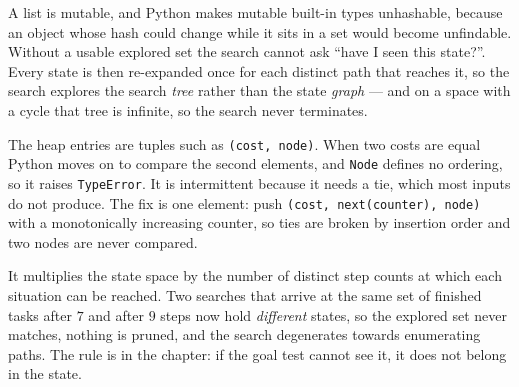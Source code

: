 \begin{ans}
  \item A list is mutable, and Python makes mutable built-in types unhashable,
        because an object whose hash could change while it sits in a set would
        become unfindable. Without a usable explored set the search cannot ask
        ``have I seen this state?''. Every state is then re-expanded once for each
        distinct path that reaches it, so the search explores the search
        \emph{tree} rather than the state \emph{graph} --- and on a space with a
        cycle that tree is infinite, so the search never terminates.
  \item The heap entries are tuples such as \texttt{(cost, node)}. When two costs
        are equal Python moves on to compare the second elements, and \texttt{Node}
        defines no ordering, so it raises \texttt{TypeError}. It is intermittent
        because it needs a tie, which most inputs do not produce. The fix is one
        element: push \texttt{(cost, next(counter), node)} with a monotonically
        increasing counter, so ties are broken by insertion order and two nodes are
        never compared.
  \item It multiplies the state space by the number of distinct step counts at
        which each situation can be reached. Two searches that arrive at the same
        set of finished tasks after $7$ and after $9$ steps now hold
        \emph{different} states, so the explored set never matches, nothing is
        pruned, and the search degenerates towards enumerating paths. The rule is
        in the chapter: if the goal test cannot see it, it does not belong in the
        state.
\end{ans}

